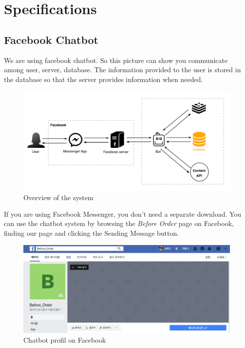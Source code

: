 \section{Specifications}
\subsection{Facebook Chatbot}
We are using facebook chatbot. So this picture can show you communicate among user, server, database. The information provided to the user is stored in the database so that the server provides information when needed.

\begin{figure}[htbp]
\centerline{\includegraphics[width=\linewidth]{./pictures/facebook_overview}}
\caption{Overview of the system}
\label{fig}
\end{figure}
\FloatBarrier

If you are using Facebook Messenger, you don’t need a separate download. You can use the chatbot system by browsing the \emph{Before Order} page on Facebook, finding our page and clicking the Sending Message button.

\begin{figure}[htbp]
\centerline{\includegraphics[width=\linewidth]{./pictures/facebook_profil}}
\caption{Chatbot profil on Facebook}
\label{fig:facebook_profil}
\end{figure}
\FloatBarrier

